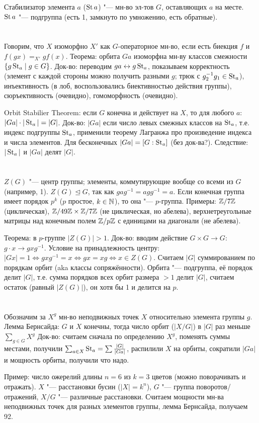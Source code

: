 Стабилизатор элемента $a$ ($\operatorname{St} a$) "--- мн-во эл-тов $G$, оставляющих $a$ на месте.
$\operatorname{St} a$ "--- подгруппа (есть 1, замкнуто по умножению, есть обратные).

\section{} %
Говорим, что $X$ изоморфно $X'$ как $G$-операторное мн-во, если
есть биекция $f$ и $f(gx)=_{X'}gf(x)$.
Теорема: орбита $Ga$ изоморфна мн-ву классов смежности $\{ g\operatorname{St}_a \mid g \in G \}$.
Док-во: переводим $ga \leftrightarrow g \operatorname{St}_a$, показываем корректность (элемент с каждой стороны можно получить
разными $g$; трюк с $g_2^{-1}g_1 \in \operatorname{St}_a$), инъективность (в лоб, воспользовались биективностью
действия группы), сюръективность (очевидно), гомоморфность (очевидно).

Orbit Stabilier Theorem: если $G$ конечна и действует на $X$, то для любого $a$:
$|Ga| \cdot |\operatorname{St}_a| = |G|$.
Док-во: $|Ga|$ если число левых смежных классов на $\operatorname{St}_a$, т.е. индекс подгруппы $\operatorname{St}_a$,
применили теорему Лагранжа про произведение индекса и числа элементов.
Для бесконечных $|Ga|=[G:\operatorname{St}_a]$ (\TODO без док-ва?).
Следствие: $|\operatorname{St}_a|$ и $|Ga|$ делят $|G|$.

\section{} %
$Z(G)$ "--- центр группы; элементы, коммутирующие вообще со всеми из $G$ (например, 1).
$Z(G) \unlhd G$, так как $gag^{-1}=agg^{-1}=a$.
Если конечная группа имеет порядок $p^k$ ($p$ простое, $k\in \mathbb{N}$), то она "--- $p$-группа.
Примеры: $\mathbb{Z}/7\mathbb{Z}$ (циклическая), $\mathbb{Z}/49\mathbb{Z} \times \mathbb{Z}/7\mathbb{Z}$ (не циклическая, но абелева),
верхнетреугольные матрицы над конечным полем $\mathbb{Z}/p\mathbb{Z}$ с единицами на диагонали (не абелева).

Теорема: в $p$-группе $|Z(G)|>1$.
Док-во: вводим действие $G\times G \to G$: $g \cdot x \to gxg^{-1}$.
Условие на принадлежность центру: $|Gx|=1 \iff gxg^{-1} = x \iff gx = xg \iff x \in Z(G)$.
Считаем $|G|$ суммированием по порядкам орбит (aka классы сопряжённости).
Орбита "--- подгруппа, её порядок делит $|G|$, т.е. сумма
порядков всех орбит размера $>1$ делит $|G|$, считаем остаток (равный $|Z(G)|$), он хотя
бы 1 и делится на $p$.

\section{} %
Обозначим за $X^g$ мн-во неподвижных точек $X$ относительно элемента группы $g$.
Лемма Бернсайда: $G$ и $X$ конечны, тогда число орбит ($|X/G|$) в $|G|$ раз меньше $\sum_{g \in G} X^g$
Док-во: считаем сначала по определению $X^g$, поменять суммы местами,
получили $\sum_{a\in X} \operatorname{St}_a=\sum \frac{|G|}{|Ga|}$, распилили $X$ на орбиты,
сократили $|Ga|$ и мощность орбиты, получили что надо.

Пример: число ожерелий длины $n=6$ из $k=3$ цветов (можно поворачивать и отражать).
$X$ "--- расстановки бусин ($|X|=k^n$), $G$ "--- группа поворотов/отражений, $X/G$ "--- различные
расстановки.
Считаем мощности мн-ва неподвижных точек для разных элементов группы, лемма Бернсайда,
получаем 92.
